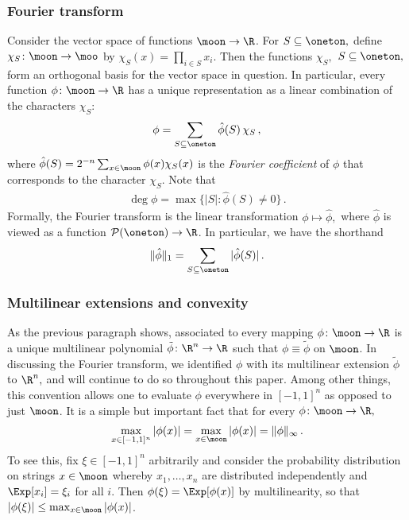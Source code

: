  
\subsubsection*{Fourier transform}

Consider the vector space of functions
$\moon\to\R$. For $S\subseteq\oneton,$ define
$\chi_S\colon\moon\to\moo$ by $\chi_S(x) =\prod_{i\in
S} x_i$. Then the functions $\chi_S,$
$S\subseteq\oneton,$ form an orthogonal basis for the
vector space in question.  In particular, every
function $\phi\colon\moon\to\R$ has a unique
representation as a linear combination of the
characters $\chi_S$: 
\[\phi=\sum_{S\subseteq\oneton} \hat \phi(S)\,\chi_S\,,\]
where $\hat\phi(S)=2^{-n}\sum_{x\in\moon}
\phi(x)\chi_S(x)$ is the \emph{Fourier coefficient} of
$\phi$ that corresponds to the character $\chi_S$. 
Note that 
\begin{align*}
\deg \phi= \max\{|S|:\hat \phi(S)\ne 0\}\,.
\end{align*}
Formally, the Fourier transform is the linear
transformation $\phi\mapsto\hat\phi,$ where $\hat\phi$ 
is viewed as a function 
$\mathcal{P}(\oneton)\to\R$. In particular, we have
the shorthand
\begin{align*}
\|\hat\phi\|_1=\sum_{S\subseteq\oneton}|\hat\phi(S)|\,.
\end{align*}

\subsubsection*{Multilinear extensions and convexity}

As the previous paragraph shows, associated to every mapping 
$\phi\colon\moon\to\R$ is a unique
multilinear polynomial $\tilde
\phi\colon\R^n\to\R$ 
such that $\phi\equiv \tilde \phi$ on
$\moon$. In discussing the Fourier transform, we
identified $\phi$ with its
multilinear extension $\tilde \phi$ to $\R^n,$ and 
will continue to do so throughout this paper. Among
other things, this
convention allows one to evaluate $\phi$ everywhere
in $[-1,1]^n$ as opposed to just $\moon$. 
It is a simple but important fact that for every
$\phi\colon\moon\to\R,$ 
\begin{align*}
\max_{x\in[-1,1]^n}|\phi(x)|
=\max_{x\in\moon}|\phi(x)| = \|\phi\|_\infty\,.
\end{align*}
To see this, fix $\xi\in[-1,1]^n$ arbitrarily and
consider the probability distribution on strings $x\in\moon$
whereby $x_1,\dots,x_n$ are distributed independently and
$\Exp[x_i]=\xi_i$  for all $i$. Then
$\phi(\xi)=\Exp[\phi(x)]$ by multilinearity, so that
$|\phi(\xi)|\leq\max_{x\in\moon}|\phi(x)|$.

